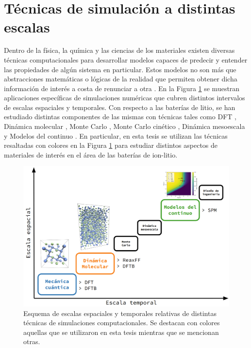 \section{Técnicas de simulación a distintas escalas}

Dentro de la física, la química y las ciencias de los materiales existen diversas
técnicas computacionales para desarrollar modelos capaces de predecir y entender 
las propiedades de algún sistema en particular. Estos modelos no son más que 
abstracciones matemáticas o lógicas de la realidad que permiten obtener dicha 
información de interés a costa de renunciar a otra \cite{franco2013}. 
En la Figura \ref{fig:escalas} se muestran aplicaciones específicas de 
simulaciones numéricas que cubren distintos intervalos de escalas espaciales y 
temporales. Con respecto a las baterías de litio, se han estudiado distintas
componentes de las mismas con técnicas tales como DFT \cite{he2019}, Dinámica 
molecular \cite{yao2022}, Monte Carlo \cite{mercer2017}, Monte Carlo cinético 
\cite{gavilan2021}, Dinámica mesoescala \cite{ryan2019} y Modelos del continuo
\cite{brosa2022}. En particular, en esta tesis se utilizan las técnicas 
resaltadas con colores en la Figura \ref{fig:escalas} para estudiar distintos 
aspectos de materiales de interés en el área de las baterías de ion-litio.
\begin{figure}[h!]
    \centering
    \includegraphics[width=.8\textwidth]{Metodos/tecnicas/escalas.png}
    \caption{Esquema de escalas espaciales y temporales relativas de distintas 
    técnicas de simulaciones computacionales. Se destacan con colores aquellas que 
    se utilizaron en esta tesis mientras que se mencionan otras.}
    \label{fig:escalas}
\end{figure}

